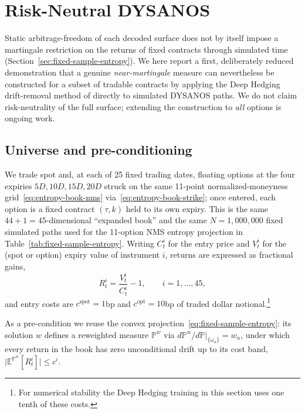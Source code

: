 \documentclass[11pt,a4paper]{article}
\newcommand{\E}{\mathbb{E}}
\renewcommand{\P}{\mathbb{P}}
\begin{document}
\section{Risk-Neutral DYSANOS}
\label{sec:risk-neutral}

Static arbitrage-freedom of each decoded surface does not by itself impose a
martingale restriction on the returns of fixed contracts through simulated
time (Section~\ref{sec:fixed-sample-entropy}).  We here report a first,
deliberately reduced demonstration that a genuine \emph{near-martingale}
measure can nevertheless be constructed for a subset of tradable contracts by
applying the Deep Hedging drift-removal method of
\cite{removedrift,removelong} directly to simulated DYSANOS paths.  We do not
claim risk-neutrality of the full surface; extending the construction to
\emph{all} options is ongoing work.

\subsection{Universe and pre-conditioning}
\label{sec:risk-neutral-universe}

We trade spot and, at each of 25 fixed trading dates, floating options at the
four expiries $5D,10D,15D,20D$ struck on the same 11-point normalized-moneyness
grid~\eqref{eq:entropy-book-nms} via~\eqref{eq:entropy-book-strike}; once
entered, each option is a fixed contract $(\tau,k)$ held to its own expiry.
This is the same $44+1=45$-dimensional ``expanded book'' and the same
$N=1{,}000{,}000$ fixed simulated paths used for the 11-option NMS entropy
projection in Table~\ref{tab:fixed-sample-entropy}.  Writing $C_t^i$ for the
entry price and $V_t^i$ for the (spot or option) expiry value of instrument
$i$, returns are expressed as fractional gains,
\begin{equation}
  R_t^i=\frac{V_t^i}{C_t^i}-1,
  \qquad i=1,\ldots,45,
  \label{eq:rn-returns}
\end{equation}
and entry costs are $c^{\mathrm{spot}}=1$bp and $c^{\mathrm{opt}}=10$bp of
traded dollar notional.\footnote{For numerical stability the Deep Hedging
training in this section uses one tenth of these costs.}

As a pre-condition we reuse the convex projection~\eqref{eq:fixed-sample-entropy}:
its solution $w$ defines a reweighted measure $\P^w$ via
$d\P^w/d\P|_{\{\omega_n\}}=w_n$, under which every return in the book has zero
unconditional drift up to its cost band,
$\bigl|\E^{\P^w}[R_t^i]\bigr|\leq c^i$.
\end{document}
